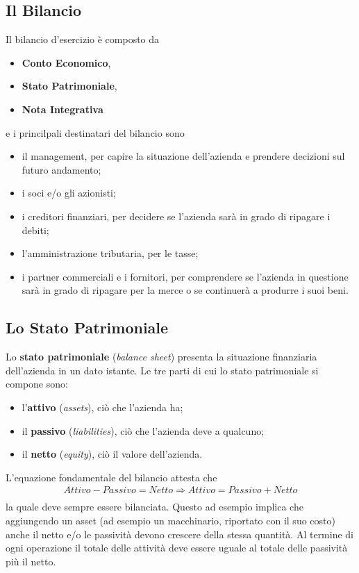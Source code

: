 \documentclass[a4paper,portrait,12pt]{article}
\theoremstyle{definition}
\begin{document}
\subsection{Il Bilancio}

Il bilancio d'esercizio è composto da
\begin{itemize}
\item \textbf{Conto Economico},
\item \textbf{Stato Patrimoniale},
\item \textbf{Nota Integrativa}
\end{itemize}
e i princilpali destinatari del bilancio sono
\begin{itemize}
\item il management, per capire la situazione dell'azienda e prendere decizioni sul futuro andamento;
\item i soci e/o gli azionisti;
\item i creditori finanziari, per decidere se l'azienda sarà in grado di ripagare i debiti;
\item l'amministrazione tributaria, per le tasse;
\item i partner commerciali e i fornitori, per comprendere se l'azienda in questione sarà in grado di ripagare per la merce o se continuerà a produrre i suoi beni.
\end{itemize}

\subsection{Lo Stato Patrimoniale}

Lo \textbf{stato patrimoniale} (\emph{balance sheet}) presenta la situazione finanziaria dell'azienda in un dato istante.
Le tre parti di cui lo stato patrimoniale si compone sono:
\begin{itemize}
\item l'\textbf{attivo} (\emph{assets}), ciò che l'azienda ha;
\item il \textbf{passivo} (\emph{liabilities}), ciò che l'azienda deve a qualcuno;
\item il \textbf{netto} (\emph{equity}), ciò il valore dell'azienda.
\end{itemize}
L'equazione fondamentale del bilancio attesta che
\begin{align*}
Attivo - Passivo = Netto \Rightarrow Attivo = Passivo + Netto\\
\end{align*}
la quale deve sempre essere bilanciata.
Questo ad esempio implica che aggiungendo un asset (ad esempio un macchinario, riportato con il suo costo) anche il netto e/o le passività devono crescere della stessa quantità.
Al termine di ogni operazione il totale delle attività deve essere uguale al totale delle passività più il netto.
\end{document}
